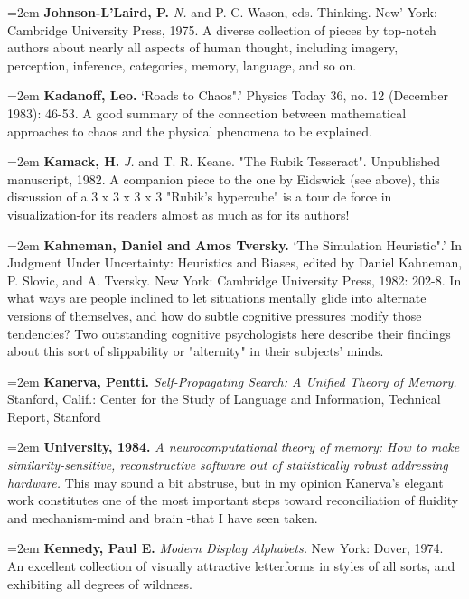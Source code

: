 \par\noindent\hangindent=2em {\bf Johnson-L'Laird, P.} {\it N.} and P. C. Wason, eds. Thinking. New' York: Cambridge University Press, 1975. A diverse collection of pieces by top-notch authors about nearly all aspects of human thought, including imagery, perception, inference, categories, memory, language, and so on.

\par\noindent\hangindent=2em {\bf Kadanoff, Leo.} `Roads to Chaos".' Physics Today 36, no. 12 (December 1983): 46-53. A good summary of the connection between mathematical approaches to chaos and the physical phenomena to be explained.

\par\noindent\hangindent=2em {\bf Kamack, H.} {\it J.} and T. R. Keane. "The Rubik Tesseract". Unpublished manuscript, 1982. A companion piece to the one by Eidswick (see above), this discussion of a 3 x 3 x 3 x 3 "Rubik's hypercube" is a tour de force in visualization-for its readers almost as much as for its authors!

\par\noindent\hangindent=2em {\bf Kahneman, Daniel and Amos Tversky.} `The Simulation Heuristic".' In Judgment Under Uncertainty: Heuristics and Biases, edited by Daniel Kahneman, P. Slovic, and A. Tversky. New York: Cambridge University Press, 1982: 202-8. In what ways are people inclined to let situations mentally glide into alternate versions of themselves, and how do subtle cognitive pressures modify those tendencies? Two outstanding cognitive psychologists here describe their findings about this sort of slippability or "alternity" in their subjects' minds.

\par\noindent\hangindent=2em {\bf Kanerva, Pentti.} {\it Self-Propagating Search: A Unified Theory of Memory.} Stanford, Calif.: Center for the Study of Language and Information, Technical Report, Stanford

\par\noindent\hangindent=2em {\bf University, 1984.} {\it A neurocomputational theory of memory: How to make similarity-sensitive, reconstructive software out of statistically robust addressing hardware.} This may sound a bit abstruse, but in my opinion Kanerva's elegant work constitutes one of the most important steps toward reconciliation of fluidity and mechanism-mind and brain -that I have seen taken.

\par\noindent\hangindent=2em {\bf Kennedy, Paul E.} {\it Modern Display Alphabets.} New York: Dover, 1974. An excellent collection of visually attractive letterforms in styles of all sorts, and exhibiting all degrees of wildness.

